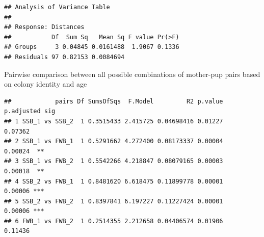 \documentclass[]{article}
\newenvironment{Shaded}{\begin{snugshade}}{\end{snugshade}}
\newcommand{\KeywordTok}[1]{\textcolor[rgb]{0.13,0.29,0.53}{\textbf{#1}}}
\newcommand{\DataTypeTok}[1]{\textcolor[rgb]{0.13,0.29,0.53}{#1}}
\newcommand{\DecValTok}[1]{\textcolor[rgb]{0.00,0.00,0.81}{#1}}
\newcommand{\StringTok}[1]{\textcolor[rgb]{0.31,0.60,0.02}{#1}}
\newcommand{\CommentTok}[1]{\textcolor[rgb]{0.56,0.35,0.01}{\textit{#1}}}
\newcommand{\OperatorTok}[1]{\textcolor[rgb]{0.81,0.36,0.00}{\textbf{#1}}}
\newcommand{\NormalTok}[1]{#1}
\begin{document}
\begin{verbatim}
## Analysis of Variance Table
## 
## Response: Distances
##           Df  Sum Sq   Mean Sq F value Pr(>F)
## Groups     3 0.04845 0.0161488  1.9067 0.1336
## Residuals 97 0.82153 0.0084694
\end{verbatim}

Pairwise comparison between all possible combinations of mother-pup
pairs based on colony identity and age

\begin{Shaded}
\end{Shaded}

\begin{verbatim}
##            pairs Df SumsOfSqs  F.Model         R2 p.value p.adjusted sig
## 1 SSB_1 vs SSB_2  1 0.3515433 2.415725 0.04698416 0.01227    0.07362    
## 2 SSB_1 vs FWB_1  1 0.5291662 4.272400 0.08173337 0.00004    0.00024  **
## 3 SSB_1 vs FWB_2  1 0.5542266 4.218847 0.08079165 0.00003    0.00018  **
## 4 SSB_2 vs FWB_1  1 0.8481620 6.618475 0.11899778 0.00001    0.00006 ***
## 5 SSB_2 vs FWB_2  1 0.8397841 6.197227 0.11227424 0.00001    0.00006 ***
## 6 FWB_1 vs FWB_2  1 0.2514355 2.212658 0.04406574 0.01906    0.11436
\end{verbatim}

\begin{Shaded}
\end{Shaded}
\end{document}
